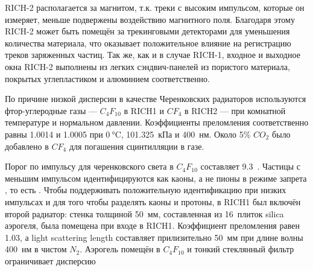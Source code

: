 
\mbox{RICH-2} располагается за магнитом, т.к. треки с высоким импульсом, которые он измеряет, меньше подвержены воздействию магнитного поля. Благодаря этому \mbox{RICH-2} может быть помещён за трекинговыми детекторами для уменьшения количества материала, что оказывает положительное влияние на регистрацию треков заряженных частиц. Так же, как и в случае \mbox{RICH-1}, входное и выходное окна \mbox{RICH-2} выполнены из легких сэндвич-панелей из пористого материала, покрытых углепластиком и алюминием соответственно.


По причине низкой дисперсии в качестве Черенковских радиаторов используются фтор-углеродные газы --- $C_{4}F_{10}$ в RICH1 и $CF_{4}$ в RICH2 --- при комнатной температуре и нормальном давлении. Коэффициенты преломления соответственно равны 1.0014 и 1.0005 при $\SI{0}{\degreeCelsius}$, 101.325~кПа и 400~нм. Около 5\% $CO_{2}$ было добавлено в $CF_{4}$ для погашения сцинтилляции в газе.


Порог по импульсу для черенковского света в $C_{4}F_{10}$ составляет 9.3~\GeVoverC. Частицы с меньшим импульсом идентифицируются как каоны, а не пионы в режиме запрета \todo, то есть \todo.
Чтобы поддерживать положительную идентификацию при низких импульсах и для того чтобы разделять каоны и протоны, в RICH1 был включён второй радиатор: стенка толщиной 50~мм, составленная из 16~плиток silica аэрогеля, была помещена при входе в RICH1. Коэффициент преломления равен 1.03, а light scattering length \todo составляет прилизительно 50~мм при длине волны 400~нм в чистом $N_2$. Аэрогель помещён в $C_{4}F_{10}$ \todo и тонкий стеклянный фильтр ограничивает дисперсию \todo

